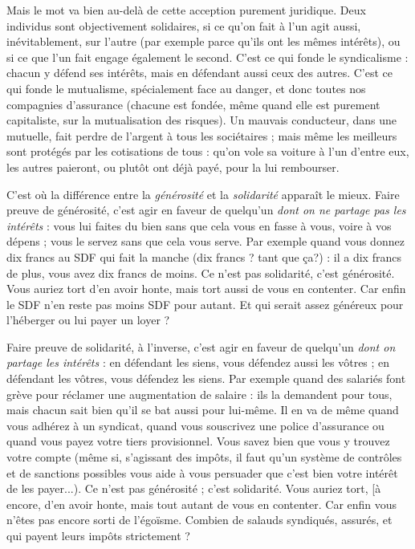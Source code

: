 Mais le mot va bien au-delà de cette acception purement juridique. Deux
individus sont objectivement solidaires, si ce qu’on fait à l’un agit aussi, inévitablement,
sur l’autre (par exemple parce qu’ils ont les mêmes intérêts), ou si ce
que l’un fait engage également le second. C’est ce qui fonde le syndicalisme :
chacun y défend ses intérêts, mais en défendant aussi ceux des autres. C’est ce
qui fonde le mutualisme, spécialement face au danger, et donc toutes nos compagnies
d’assurance (chacune est fondée, même quand elle est purement capitaliste,
sur la mutualisation des risques). Un mauvais conducteur, dans une
mutuelle, fait perdre de l’argent à tous les sociétaires ; mais même les meilleurs
sont protégés par les cotisations de tous : qu’on vole sa voiture à l’un d’entre
eux, les autres paieront, ou plutôt ont déjà payé, pour la lui rembourser.

C’est où la différence entre la {\it générosité} et la {\it solidarité} apparaît le mieux.
Faire preuve de générosité, c’est agir en faveur de quelqu'un {\it dont on ne partage
pas les intérêts} : vous lui faites du bien sans que cela vous en fasse à vous, voire
à vos dépens ; vous le servez sans que cela vous serve. Par exemple quand vous
donnez dix francs au SDF qui fait la manche (dix francs ? tant que ça?) : il a
dix francs de plus, vous avez dix francs de moins. Ce n’est pas solidarité, c’est
générosité. Vous auriez tort d’en avoir honte, mais tort aussi de vous en
contenter. Car enfin le SDF n’en reste pas moins SDF pour autant. Et qui
serait assez généreux pour l’héberger ou lui payer un loyer ?

Faire preuve de solidarité, à l'inverse, c’est agir en faveur de quelqu'un {\it dont
on partage les intérêts} : en défendant les siens, vous défendez aussi les vôtres ; en
défendant les vôtres, vous défendez les siens. Par exemple quand des salariés
font grève pour réclamer une augmentation de salaire : ils la demandent pour
tous, mais chacun sait bien qu’il se bat aussi pour lui-même. Il en va de même
quand vous adhérez à un syndicat, quand vous souscrivez une police d’assurance
ou quand vous payez votre tiers provisionnel. Vous savez bien que vous
y trouvez votre compte (même si, s'agissant des impôts, il faut qu’un système
de contrôles et de sanctions possibles vous aide à vous persuader que c’est bien
votre intérêt de les payer...). Ce n’est pas générosité ; c’est solidarité. Vous
auriez tort, [à encore, d’en avoir honte, mais tout autant de vous en contenter.
Car enfin vous n'êtes pas encore sorti de l’égoïsme. Combien de salauds syndiqués,
assurés, et qui payent leurs impôts strictement ?

